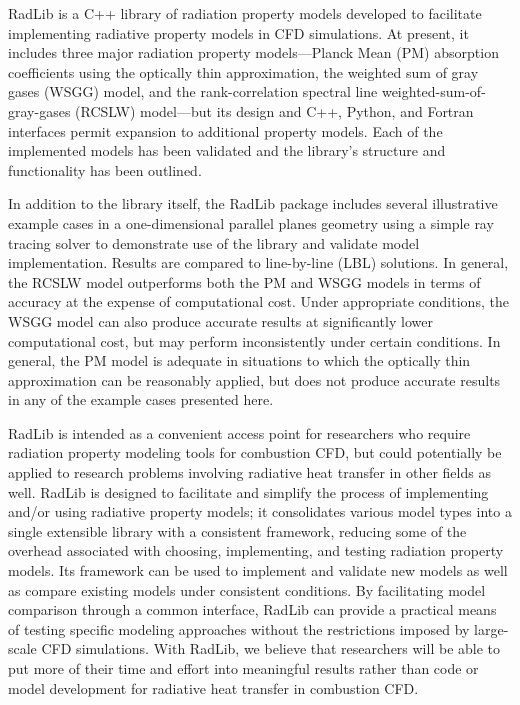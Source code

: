 \documentclass[preprint,12pt]{elsarticle}
\begin{document}
RadLib is a C++ library of radiation property models developed to facilitate implementing radiative property models in CFD simulations. At present, it includes three major radiation property models---Planck Mean (PM) absorption coefficients using the optically thin approximation, the weighted sum of gray gases (WSGG) model, and the rank-correlation spectral line weighted-sum-of-gray-gases (RCSLW) model---but its design and C++, Python, and Fortran interfaces permit expansion to additional property models. Each of the implemented models has been validated and the library's structure and functionality has been outlined. 

In addition to the library itself, the RadLib package includes several illustrative example cases in a one-dimensional parallel planes geometry using a simple ray tracing solver to demonstrate use of the library and validate model implementation. Results are compared to line-by-line (LBL) solutions. In general, the RCSLW model outperforms both the PM and WSGG models in terms of accuracy at the expense of computational cost. Under appropriate conditions, the WSGG model can also produce accurate results at significantly lower computational cost, but may perform inconsistently under certain conditions. In general, the PM model is adequate in situations to which the optically thin approximation can be reasonably applied, but does not produce accurate results in any of the example cases presented here. 

RadLib is intended as a convenient access point for researchers who require radiation property modeling tools for combustion CFD, but could potentially be applied to research problems involving radiative heat transfer in other fields as well. RadLib is designed to facilitate and simplify the process of implementing and/or using radiative property models; it consolidates various model types into a single extensible library with a consistent framework, reducing some of the overhead associated with choosing, implementing, and testing radiation property models. Its framework can be used to implement and validate new models as well as compare existing models under consistent conditions. By facilitating model comparison through a common interface, RadLib can provide a practical means of testing specific modeling approaches without the restrictions imposed by large-scale CFD simulations. With RadLib, we believe that researchers will be able to put more of their time and effort into meaningful results rather than code or model development for radiative heat transfer in combustion CFD. 
\end{document}
